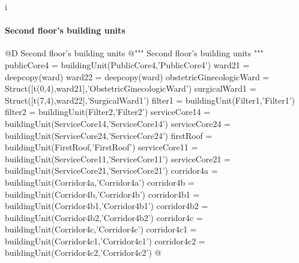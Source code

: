 i\documentclass[11pt,oneside]{article}    %
\begin{document}
\paragraph{Second floor's building units}
@D Second floor's building units 
@{""" Second floor's building units """
publicCore4 = buildingUnit(PublicCore4,'PublicCore4')
ward21 = deepcopy(ward)
ward22 = deepcopy(ward)
obstetricGinecologicWard = Struct([t(0,4),ward21],'ObstetricGinecologicWard')
surgicalWard1 = Struct([t(7,4),ward22],'SurgicalWard1')
filter1 = buildingUnit(Filter1,'Filter1')
filter2 = buildingUnit(Filter2,'Filter2')
serviceCore14 = buildingUnit(ServiceCore14,'ServiceCore14')
serviceCore24 = buildingUnit(ServiceCore24,'ServiceCore24')
firstRoof = buildingUnit(FirstRoof,'FirstRoof')
serviceCore11 = buildingUnit(ServiceCore11,'ServiceCore11')
serviceCore21 = buildingUnit(ServiceCore21,'ServiceCore21')
corridor4a = buildingUnit(Corridor4a,'Corridor4a')
corridor4b = buildingUnit(Corridor4b,'Corridor4b')
corridor4b1 = buildingUnit(Corridor4b1,'Corridor4b1')
corridor4b2 = buildingUnit(Corridor4b2,'Corridor4b2')
corridor4c = buildingUnit(Corridor4c,'Corridor4c')
corridor4c1 = buildingUnit(Corridor4c1,'Corridor4c1')
corridor4c2 = buildingUnit(Corridor4c2,'Corridor4c2')
@}
\end{document}
